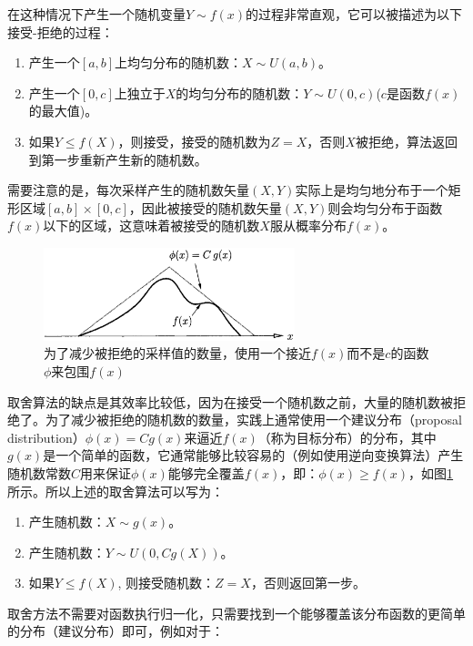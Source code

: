 在这种情况下产生一个随机变量$Y\sim f(x)$的过程非常直观，它可以被描述为以下接受-拒绝的过程：

\begin{enumerate}
	\item 产生一个$[a,b]$上均匀分布的随机数：$X\sim U(a,b)$。
	\item 产生一个$[0,c]$上独立于$X$的均匀分布的随机数：$Y\sim U(0,c)$($c$是函数$f(x)$的最大值)。 
	\item 如果$Y\leq f(X)$，则接受，接受的随机数为$Z=X$，否则$X$被拒绝，算法返回到第一步重新产生新的随机数。
\end{enumerate}

需要注意的是，每次采样产生的随机数矢量$(X,Y)$实际上是均匀地分布于一个矩形区域$[a,b]\times [0,c]$，因此被接受的随机数矢量$(X,Y)$则会均匀分布于函数$f(x)$以下的区域，这意味着被接受的随机数$X$服从概率分布$f(x)$。

\begin{figure}
\sidecaption
	\includegraphics[width=0.65\textwidth]{figures/mc/mc-7}
	\caption{为了减少被拒绝的采样值的数量，使用一个接近$f(x)$而不是$c$的函数$\phi$来包围$f(x)$}
	\label{f:mc-rejection-generalized}
\end{figure}

取舍算法的缺点是其效率比较低，因为在接受一个随机数之前，大量的随机数被拒绝了。为了减少被拒绝的随机数的数量，实践上通常使用一个建议分布（proposal distribution）$\phi (x)=Cg(x)$来逼近$f(x)$（称为目标分布）的分布，其中$g(x)$是一个简单的函数，它通常能够比较容易的（例如使用逆向变换算法）产生随机数常数$C$用来保证$\phi (x)$能够完全覆盖$f(x)$，即：$\phi (x)\geq f(x)$，如图\ref{f:mc-rejection-generalized}所示。所以上述的取舍算法可以写为：

\begin{enumerate}
	\item 产生随机数：$X\sim g(x)$。
	\item 产生随机数：$Y\sim U(0,Cg(X))$。
	\item 如果$Y\leq f(X)$, 则接受随机数：$Z=X$，否则返回第一步。 
\end{enumerate}

取舍方法不需要对函数执行归一化，只需要找到一个能够覆盖该分布函数的更简单的分布（建议分布）即可，例如对于：

